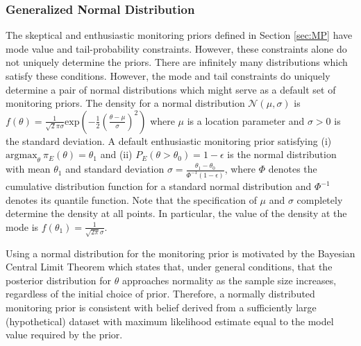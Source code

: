 \documentclass[useAMS,usenatbib,referee]{biom}
\begin{document}
\subsubsection{Generalized Normal Distribution}\label{sec:gen_normal}
The skeptical and enthusiastic monitoring priors defined in Section \ref{sec:MP} have mode value and tail-probability constraints. 
%
However, these constraints alone do not uniquely determine the priors.
%
There are infinitely many distributions which satisfy these conditions.
%
However, the mode and tail constraints do uniquely determine a pair of normal 
distributions which might serve as a default set of monitoring priors. The density for a  normal distribution $\mathcal{N}(\mu,\sigma)$ is $f(\theta)=\frac{1}{\sqrt 2\pi\sigma} \text{exp}(-\frac{1}{2}(\frac{\theta-\mu}{\sigma})^2)$ where $\mu$ is a location parameter and $\sigma>0$ is the standard deviation. A default enthusiastic monitoring prior satisfying (i) $\text{argmax}_\theta~\pi_E(\theta)=\theta_1$
and (ii) $P_E(\theta > \theta_0)=1-\epsilon$ is the normal distribution with mean $\theta_1$ and standard deviation $\sigma=\frac{\theta_1-\theta_0}{\Phi^{-1}(1-\epsilon)}$, where $\Phi$ denotes the cumulative distribution function for a standard normal distribution and $\Phi^{-1}$ denotes its quantile function. Note that the specification of $\mu$ and $\sigma$ completely determine the density at all points. In particular, the value of the density at the mode is $f(\theta_1)=\frac{1}{\sqrt{2\pi}\sigma}$.

Using a normal distribution for the monitoring prior is motivated by the Bayesian Central Limit Theorem which states that, under general conditions, that the posterior distribution for $\theta$ approaches normality as the sample size increases, regardless of the initial choice of prior.
%
Therefore, a normally distributed monitoring prior is consistent with belief derived from a sufficiently large (hypothetical) dataset with maximum likelihood estimate equal to the model value required by the prior.
\end{document}
